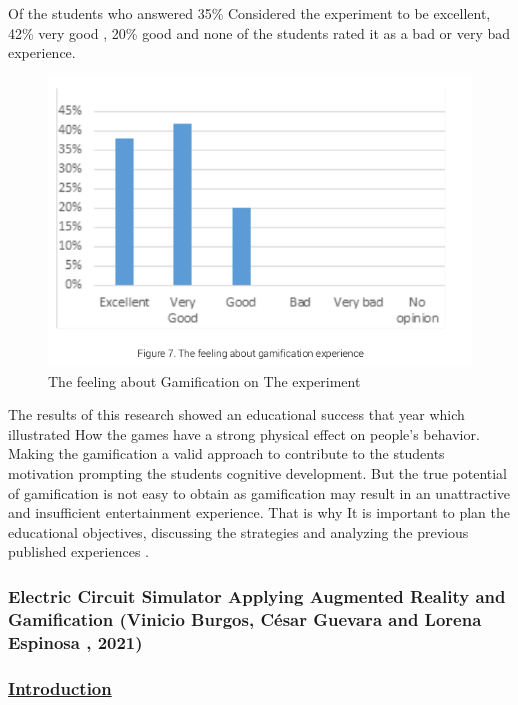 \documentclass[../main.tex]{subfiles}
\begin{document}
Of the students who answered 35\%  Considered the experiment to be excellent, 42\% very good , 20\% good and none of the students rated it as a bad or very bad experience.

\begin{figure}[!ht]
\centering
\includegraphics[scale=0.3]{images/chapter2/image14.png}
\caption{The feeling about Gamification on The experiment}
\label{The feeling about Gamification on The experiment
}
\end{figure}

The results of this research showed an educational success that year which illustrated How the games have a strong physical effect on people’s behavior. Making the gamification a valid approach to contribute to the students motivation prompting the students cognitive development. But the true potential of gamification is not easy to obtain as gamification may result in an unattractive and insufficient entertainment experience. That is why It is important to plan the educational objectives, discussing the strategies and analyzing the previous published experiences \cite{26}. 

\subsubsection{Electric Circuit Simulator Applying Augmented Reality and Gamiﬁcation (Vinicio Burgos, César Guevara and Lorena Espinosa , 2021)}

\subsubsection*{\underline{Introduction}}
\end{document}
